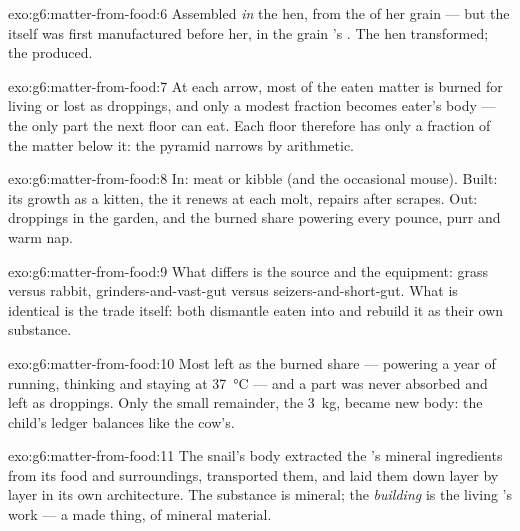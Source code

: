 \begin{solution}{exo:g6:matter-from-food:6}
Assembled \emph{in} the hen, from the  of her
grain --- but the  itself was first
manufactured before her, in the grain 's . The
hen transformed; the  produced.
\end{solution}

\begin{solution}{exo:g6:matter-from-food:7}
At each arrow, most of the eaten matter is burned for
living or lost as droppings, and only a modest fraction
becomes eater's body --- the only part the next floor can
eat. Each floor therefore has only a fraction of the
matter below it: the pyramid narrows by arithmetic.
\end{solution}

\begin{solution}{exo:g6:matter-from-food:8}
In: meat or kibble (and the occasional mouse). Built: its
growth as a kitten, the  it renews at each molt, repairs
after scrapes. Out: droppings in the garden, and the burned
share powering every pounce, purr and warm nap.
\end{solution}

\begin{solution}{exo:g6:matter-from-food:9}
What differs is the source and the equipment: grass versus
rabbit, grinders-and-vast-gut versus seizers-and-short-gut.
What is identical is the trade itself: both dismantle eaten
 into  and rebuild it as their own
substance.
\end{solution}

\begin{solution}{exo:g6:matter-from-food:10}
Most left as the burned share --- powering a year of
running, thinking and staying at
\qty{37}{\degreeCelsius} --- and a part was never absorbed
and left as droppings. Only the small remainder, the
\qty{3}{kg}, became new body: the child's ledger balances
like the cow's.
\end{solution}

\begin{solution}{exo:g6:matter-from-food:11}
The snail's body extracted the 's mineral ingredients
from its food and surroundings, transported them, and laid
them down layer by layer in its own architecture. The
substance is mineral; the \emph{building} is the living
's work --- a made thing, of mineral material.
\end{solution}

